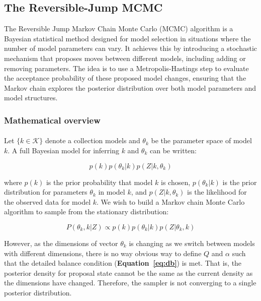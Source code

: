\subsection{The Reversible-Jump MCMC}
The Reversible Jump Markov Chain Monte Carlo (MCMC) algorithm is a Bayesian statistical method designed for model selection in situations where the number of model parameters can vary. It achieves this by introducing a stochastic mechanism that proposes moves between different models, including adding or removing parameters. The idea is to use a Metropolis-Hastings step to evaluate the acceptance probability of these proposed model changes, ensuring that the Markov chain explores the posterior distribution over both model parameters and model structures.  

\subsubsection{Mathematical overview}

\paragraph{}Let $\{k \in \mathcal{K}\}$ denote a collection models and  $\theta_k$ be the parameter space of model $k$. A full Bayesian model for inferring $k$ and $\theta_k$ can be written:

$$p(k)p(\theta_k|k)p(Z| k, \theta_k) $$

where $p(k)$ is the prior probability that model $k$ is chosen, $p(\theta_k|k)$ is the prior distribution for parameters $\theta_k$ in model $k$, and $p(Z| k, \theta_k) $ is the likelihood for the observed data for model $k$. We wish to build a Markov chain Monte Carlo algorithm to sample from the stationary distribution: 

\begin{equation}
P(\theta_k, k | Z) \propto p(k)p(\theta_k|k)p(Z | \theta_k, k)
\end{equation}

However, as the dimensions of vector $\theta_k$ is changing as we switch between models with different dimensions, there is no way obvious way to define $Q$ and $\alpha$ such that the detailed balance condition (\textbf{Equation~\ref{eq:db}}) is met. That is, the posterior density for proposal state cannot be the same as the current density as the dimensions have changed. Therefore, the sampler is not converging to a single posterior distribution. 

